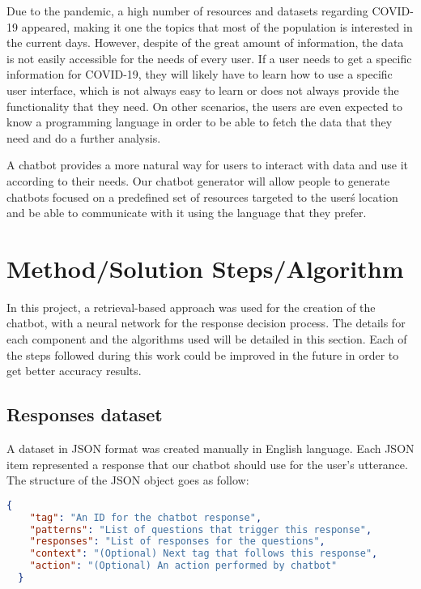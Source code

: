 \documentclass[]{article}
\begin{document}
Due to the pandemic, a high number of resources and datasets regarding COVID-19 appeared, making it one the topics that most of the population is interested in the current days. However, despite of the great amount of information, the data is not easily accessible for the needs of every user. If a user needs to get a specific information for COVID-19, they will likely have to learn how to use a specific user interface, which is not always easy to learn or does not always provide the functionality that they need. On other scenarios, the users are even expected to know a programming language in order to be able to fetch the data that they need and do a further analysis.

A chatbot provides a more natural way for users to interact with data and use it according to their needs. Our chatbot generator will allow people to generate chatbots focused on a predefined set of resources targeted to the user\'s location and be able to communicate with it using the language that they prefer.

\section{Method/Solution Steps/Algorithm}

In this project, a retrieval-based approach was used for the creation of the chatbot, with a neural network for the response decision process. The details for each component and the algorithms used will be detailed in this section. Each of the steps followed during this work could be improved in the future in order to get better accuracy results.

\subsection{Responses dataset}
A dataset in JSON format was created manually in English language. Each JSON item represented a response that our chatbot should use for the user's utterance. The structure of the JSON object goes as follow:

\begin{lstlisting}[language=json,firstnumber=1, caption=JSON object for a chatbot response]
  {
    "tag": "An ID for the chatbot response",
    "patterns": "List of questions that trigger this response",
    "responses": "List of responses for the questions",
    "context": "(Optional) Next tag that follows this response",
    "action": "(Optional) An action performed by chatbot"
  }
\end{lstlisting}
\end{document}
